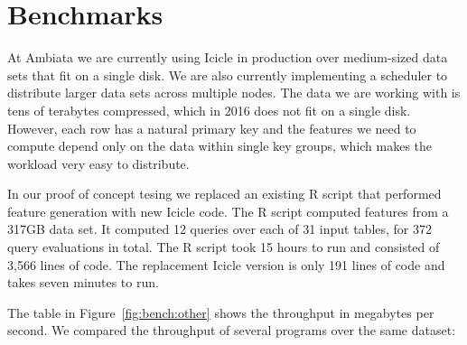 \section{Benchmarks}
\label{s:Benchmarks}


At Ambiata we are currently using Icicle in production over medium-sized data sets that fit on a single disk. We are also currently implementing a scheduler to distribute larger data sets across multiple nodes. The data we are working with is tens of terabytes compressed, which in 2016 does not fit on a single disk. However, each row has a natural primary key and the features we need to compute depend only on the data within single key groups, which makes the workload very easy to distribute.


In our proof of concept tesing we replaced an existing R script that performed feature generation with new Icicle code. The R script computed features from a 317GB data set. It computed 12 queries over each of 31 input tables, for 372 query evaluations in total. The R script took 15 hours to run and consisted of 3,566 lines of code. The replacement Icicle version is only 191 lines of code and takes seven minutes to run.

The table in Figure~\ref{fig:bench:other} shows the throughput in megabytes per second.
We compared the throughput of several programs over the same dataset:

